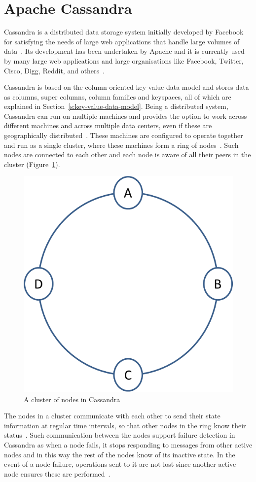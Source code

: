 \section{Apache Cassandra} \label{s:Background-Cassandra}

Cassandra is a distributed data storage system initially developed by Facebook
for satisfying the needs of large web applications that handle large
volumes of data~\citep{BOOK}. 
Its development has been undertaken by Apache  and it is  currently used by
many large web applications and large organisations like Facebook,  Twitter, 
Cisco,  Digg,  Reddit, and others~\citep{datastaxB}. 

Cassandra is based on the column-oriented key-value data model and stores data
as columns,  super columns,  column families and keyspaces, all of which are
explained in Section~\ref{s:key-value-data-model}. Being a distributed
system, Cassandra can run on multiple machines 
and provides the option  to work across different machines and across
multiple data centers,  even if these  are geographically
distributed~\citep{BOOK}.
These machines  are configured to operate together and
run as a single cluster, where these
 machines form a ring of nodes~\citep{datastax,BOOK}. Such
nodes are connected to each other and each node is aware of all their peers in
the cluster (Figure~\ref{f:cassandra-cluster}).


\begin{figure}[h] \centering 
\includegraphics[width=.3\textwidth]{./figure/Background/CassandraCluster.png}
	\caption{A cluster of nodes in Cassandra}\label{f:cassandra-cluster}
\end{figure}

The nodes in a cluster communicate with each other to send their state
information at regular time intervals,  so that other nodes in the ring  know
their status~\citep{BOOK,cassandra}. Such communication
between the nodes support failure detection in Cassandra as when
 a node fails,  it stops responding to messages from other
active nodes and in this way the rest of the nodes  know of its inactive state.
In the event of a node failure,
operations sent to it are not lost since another active node ensures these are
performed~\citep{cassandra}.

